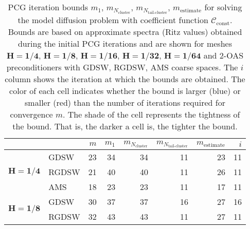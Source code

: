 \begin{table}[H]
\centering
\caption{PCG iteration bounds $m_1$, $m_{N_{\text{cluster}}}$, $m_{N_{\text{tail-cluster}}}$, $m_{\text{estimate}}$ for solving the model diffusion problem with coefficient function $\mathcal{C}_{\mathrm{const}}$. Bounds are based on approximate spectra (Ritz values) obtained during the initial PCG iterations and are shown for meshes $\mathbf{H=1/4}$, $\mathbf{H=1/8}$, $\mathbf{H=1/16}$, $\mathbf{H=1/32}$, $\mathbf{H=1/64}$ and 2-OAS preconditioners with GDSW, RGDSW, AMS coarse spaces. The $i$ column shows the iteration at which the bounds are obtained. The color of each cell indicates whether the bound is larger (blue) or smaller (red) than the number of iterations required for convergence $m$. The shade of the cell represents the tightness of the bound. That is, the darker a cell is, the tighter the bound.}
\label{tab:cg_iteration_bound_coef=const}
\begin{tabular}{llrrrrrr}
\toprule
 &  & $m$ & $m_1$ & $m_{N_{\text{cluster}}}$ & $m_{N_{\text{tail-cluster}}}$ & $m_{\text{estimate}}$ & $i$ \\
\midrule
\multirow[c]{3}{*}{$\mathbf{H=1/4}$} & GDSW & 23 & {\cellcolor[HTML]{AFC9F6}} \color[HTML]{000000} 34 & {\cellcolor[HTML]{AFC9F6}} \color[HTML]{000000} 34 & {\cellcolor[HTML]{945357}} \color[HTML]{F1F1F1} 11 & {\cellcolor[HTML]{7EAFF1}} \color[HTML]{000000} 23 & 11 \\
\cline{2-8}
 & RGDSW & 21 & {\cellcolor[HTML]{AFC9F6}} \color[HTML]{000000} 40 & {\cellcolor[HTML]{AFC9F6}} \color[HTML]{000000} 40 & {\cellcolor[HTML]{945357}} \color[HTML]{F1F1F1} 11 & {\cellcolor[HTML]{7EAFF1}} \color[HTML]{000000} 26 & 11 \\
\cline{2-8}
 & AMS & 18 & {\cellcolor[HTML]{7EAFF1}} \color[HTML]{000000} 23 & {\cellcolor[HTML]{7EAFF1}} \color[HTML]{000000} 23 & {\cellcolor[HTML]{BB9CA9}} \color[HTML]{F1F1F1} 11 & {\cellcolor[HTML]{945357}} \color[HTML]{F1F1F1} 17 & 11 \\
\cline{1-8} \cline{2-8}
\multirow[c]{3}{*}{$\mathbf{H=1/8}$} & GDSW & 30 & {\cellcolor[HTML]{7EAFF1}} \color[HTML]{000000} 37 & {\cellcolor[HTML]{7EAFF1}} \color[HTML]{000000} 37 & {\cellcolor[HTML]{BB9CA9}} \color[HTML]{F1F1F1} 16 & {\cellcolor[HTML]{945357}} \color[HTML]{F1F1F1} 27 & 16 \\
\cline{2-8}
 & RGDSW & 32 & {\cellcolor[HTML]{7EAFF1}} \color[HTML]{000000} 43 & {\cellcolor[HTML]{7EAFF1}} \color[HTML]{000000} 43 & {\cellcolor[HTML]{BB9CA9}} \color[HTML]{F1F1F1} 11 & {\cellcolor[HTML]{945357}} \color[HTML]{F1F1F1} 27 & 11 \\

\end{tabular}
\end{table}
